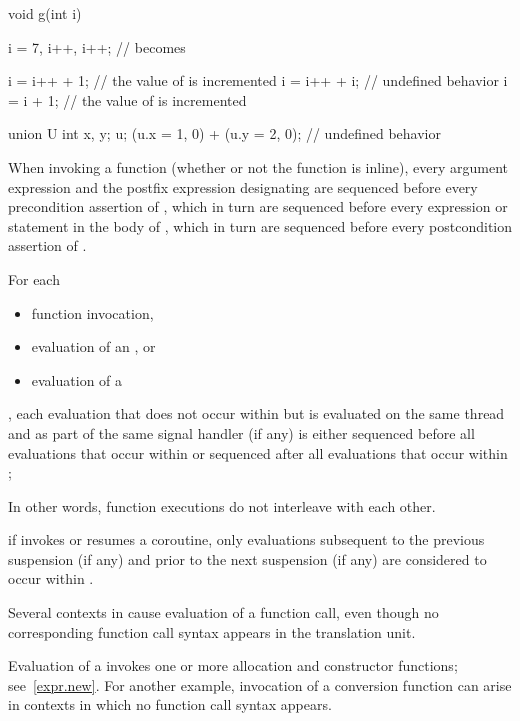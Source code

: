 \begin{example}
\begin{codeblock}
void g(int i) {
  i = 7, i++, i++;              //  becomes 

  i = i++ + 1;                  // the value of  is incremented
  i = i++ + i;                  // undefined behavior
  i = i + 1;                    // the value of  is incremented

  union U { int x, y; } u;
  (u.x = 1, 0) + (u.y = 2, 0);  // undefined behavior
}
\end{codeblock}
\end{example}

\pnum
When invoking a function  (whether or not the function is inline),
every argument expression and
the postfix expression designating 
are sequenced before
every precondition assertion of ,
which in turn are sequenced before
every expression or statement
in the body of ,
which in turn are sequenced before
every postcondition assertion of .

\pnum
For each
\begin{itemize}
\item function invocation,
\item evaluation of an , or
\item evaluation of a 
\end{itemize}
,
each evaluation that does not occur within 
but is evaluated on the same thread and as part of the same signal handler (if any)
is either sequenced before all evaluations that occur within 
or sequenced after all evaluations that occur within ;
\begin{footnote}
In other words,
function executions do not interleave with each other.
\end{footnote}
if  invokes or resumes a coroutine,
only evaluations
subsequent to the previous suspension (if any) and
prior to the next suspension (if any)
are considered to occur within .

\pnum
Several contexts in \Cpp{} cause evaluation of a function call, even
though no corresponding function call syntax appears in the translation
unit.
\begin{example}
Evaluation of a  invokes one or more allocation
and constructor functions; see~\ref{expr.new}. For another example,
invocation of a conversion function can arise in
contexts in which no function call syntax appears.
\end{example}

